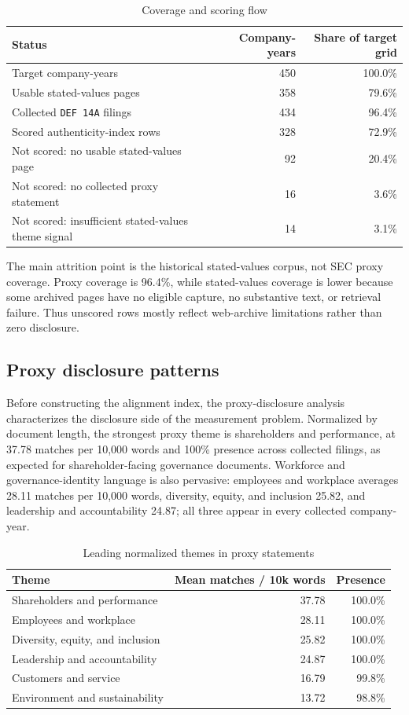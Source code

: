 \documentclass[11pt]{article}
\begin{document}
\begin{table}[H]
\centering
\caption{Coverage and scoring flow}
\label{tab:coverage}
\begin{tabular}{lrr}
\toprule
Status & Company-years & Share of target grid \\
\midrule
Target company-years & 450 & 100.0\% \\
Usable stated-values pages & 358 & 79.6\% \\
Collected \texttt{DEF 14A} filings & 434 & 96.4\% \\
Scored authenticity-index rows & 328 & 72.9\% \\
Not scored: no usable stated-values page & 92 & 20.4\% \\
Not scored: no collected proxy statement & 16 & 3.6\% \\
Not scored: insufficient stated-values theme signal & 14 & 3.1\% \\
\bottomrule
\end{tabular}
\end{table}

The main attrition point is the historical stated-values corpus, not SEC proxy coverage. Proxy
coverage is 96.4\%, while stated-values coverage is lower because some archived pages have no
eligible capture, no substantive text, or retrieval failure. Thus unscored rows mostly reflect
web-archive limitations rather than zero disclosure.

\subsection{Proxy disclosure patterns}

Before constructing the alignment index, the proxy-disclosure analysis characterizes the disclosure
side of the measurement problem. Normalized by document length, the strongest proxy theme is
shareholders and performance, at 37.78 matches per 10,000 words and 100\% presence across collected
filings, as expected for shareholder-facing governance documents. Workforce and governance-identity
language is also pervasive: employees and workplace averages 28.11 matches per 10,000 words,
diversity, equity, and inclusion 25.82, and leadership and accountability 24.87; all three appear
in every collected company-year.

\begin{table}[H]
\centering
\caption{Leading normalized themes in proxy statements}
\label{tab:proxy-themes}
\begin{tabular}{lrr}
\toprule
Theme & Mean matches / 10k words & Presence \\
\midrule
Shareholders and performance & 37.78 & 100.0\% \\
Employees and workplace & 28.11 & 100.0\% \\
Diversity, equity, and inclusion & 25.82 & 100.0\% \\
Leadership and accountability & 24.87 & 100.0\% \\
Customers and service & 16.79 & 99.8\% \\
Environment and sustainability & 13.72 & 98.8\% \\
\bottomrule
\end{tabular}
\end{table}
\end{document}
